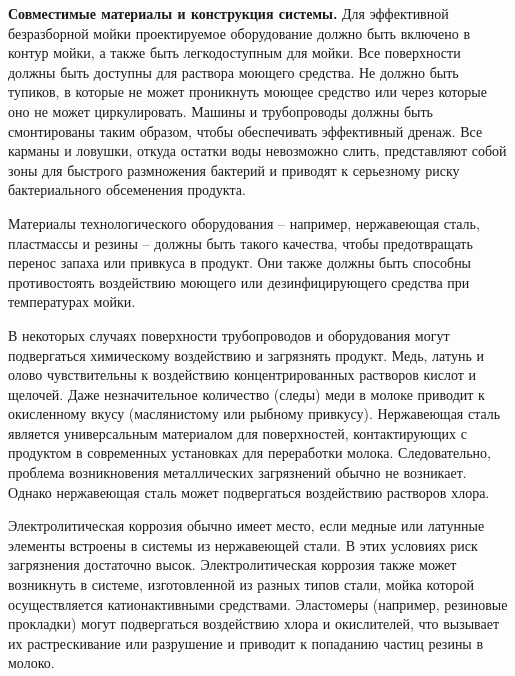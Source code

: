 {\par \redline \textbf{Совместимые материалы и конструкция системы.} Для эффективной безразборной мойки проектируемое оборудование должно быть включено в контур мойки, а также быть легкодоступным для мойки. Все поверхности должны быть доступны для раствора моющего средства. Не должно быть тупиков, в которые не может проникнуть моющее средство или через которые оно не может циркулировать. Машины и трубопроводы должны быть смонтированы таким образом, чтобы обеспечивать эффективный дренаж. Все карманы и ловушки, откуда остатки воды невозможно слить, представляют собой зоны для быстрого размножения бактерий и приводят к серьезному риску бактериального обсеменения продукта.



\par \redline Материалы технологического оборудования {--} например, нержавеющая сталь, пластмассы и резины {--} должны быть такого качества, чтобы предотвращать перенос запаха или привкуса в продукт. Они также должны быть способны противостоять воздействию моющего или дезинфицирующего средства при температурах мойки.



\par \redline В некоторых случаях поверхности трубопроводов и оборудования могут подвергаться химическому воздействию и загрязнять продукт. Медь, латунь и олово чувствительны к воздействию концентрированных растворов кислот и щелочей. Даже незначительное количество (следы) меди в молоке приводит к окисленному вкусу (маслянистому или рыбному привкусу). Нержавеющая сталь является универсальным материалом для поверхностей, контактирующих с продуктом в современных установках для переработки молока. Следовательно, проблема возникновения металлических загрязнений обычно не возникает. Однако нержавеющая сталь может подвергаться воздействию растворов хлора.

\par \redline Электролитическая коррозия обычно имеет место, если медные или латунные элементы встроены в системы из нержавеющей стали. В этих условиях риск загрязнения достаточно высок. Электролитическая коррозия также может возникнуть в системе, изготовленной из разных типов стали, мойка которой осуществляется катионактивными средствами. Эластомеры (например, резиновые прокладки) могут подвергаться воздействию хлора и окислителей, что вызывает их растрескивание или разрушение и приводит к попаданию частиц резины в молоко.



}
